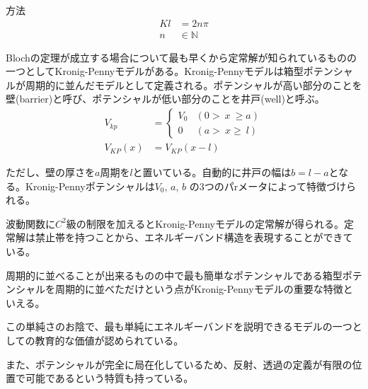 \documentclass[a4paper, lualatex]{bxjsarticle}
\begin{document}
\begin{section}{方法}
        \begin{align}
         Kl&=2n\pi\nonumber\\
            n&\in \mathbb{N}
        \end{align}
        \par Blochの定理が成立する場合について最も早くから定常解が知られているものの一つとしてKronig-Pennyモデルがある。Kronig-Pennyモデルは箱型ポテンシャルが周期的に並んだモデルとして定義される。ポテンシャルが高い部分のことを壁(barrier)と呼び、ポテンシャルが低い部分のことを井戸(well)と呼ぶ。
        \begin{align}
         V_{kp}&=\begin{cases}V_0&(0\gt\ x\ \ge a)\\ 0&(a\gt\ x\ge\ l)\end{cases}\nonumber\\
            V_{KP}(x)&=V_{KP}(x-l)
        \end{align}
        \par ただし、壁の厚さを$a$周期を$l$と置いている。自動的に井戸の幅は$b=l-a$となる。Kronig-Pennyポテンシャルは$V_0$, $a$, $b$ の3つのパrメータによって特徴づけられる。
        \par 波動関数に$C^2$級の制限を加えるとKronig-Pennyモデルの定常解が得られる。定常解は禁止帯を持つことから、エネルギーバンド構造を表現することができている。
        \par 周期的に並べることが出来るものの中で最も簡単なポテンシャルである箱型ポテンシャルを周期的に並べただけという点がKronig-Pennyモデルの重要な特徴といえる。
        \par この単純さのお陰で、最も単純にエネルギーバンドを説明できるモデルの一つとしての教育的な価値が認められている。
        \par また、ポテンシャルが完全に局在化しているため、反射、透過の定義が有限の位置で可能であるという特質も持っている。
    \end{section}
\end{document}
